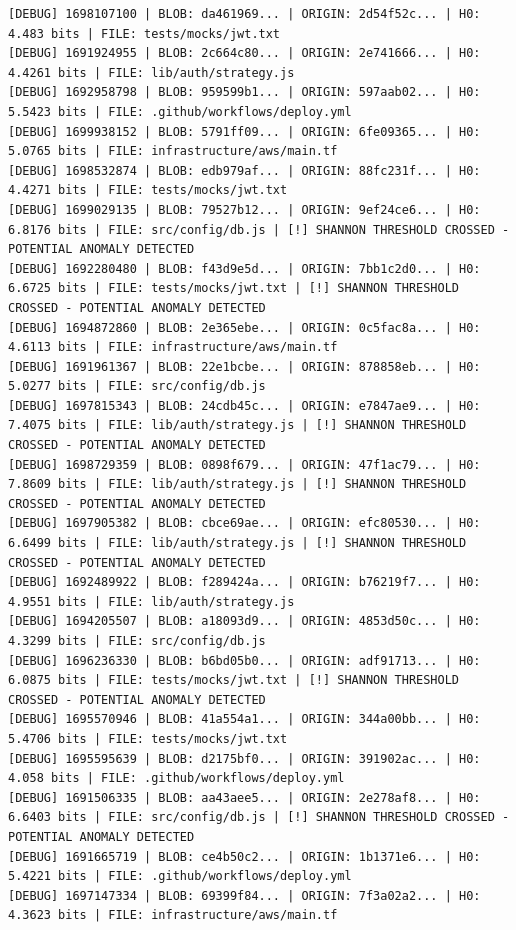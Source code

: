 \documentclass[12pt, a4paper, oneside]{report}
\begin{document}
\begin{lstlisting}[basicstyle=\tiny\ttfamily]
[DEBUG] 1698107100 | BLOB: da461969... | ORIGIN: 2d54f52c... | H0: 4.483 bits | FILE: tests/mocks/jwt.txt
[DEBUG] 1691924955 | BLOB: 2c664c80... | ORIGIN: 2e741666... | H0: 4.4261 bits | FILE: lib/auth/strategy.js
[DEBUG] 1692958798 | BLOB: 959599b1... | ORIGIN: 597aab02... | H0: 5.5423 bits | FILE: .github/workflows/deploy.yml
[DEBUG] 1699938152 | BLOB: 5791ff09... | ORIGIN: 6fe09365... | H0: 5.0765 bits | FILE: infrastructure/aws/main.tf
[DEBUG] 1698532874 | BLOB: edb979af... | ORIGIN: 88fc231f... | H0: 4.4271 bits | FILE: tests/mocks/jwt.txt
[DEBUG] 1699029135 | BLOB: 79527b12... | ORIGIN: 9ef24ce6... | H0: 6.8176 bits | FILE: src/config/db.js | [!] SHANNON THRESHOLD CROSSED - POTENTIAL ANOMALY DETECTED
[DEBUG] 1692280480 | BLOB: f43d9e5d... | ORIGIN: 7bb1c2d0... | H0: 6.6725 bits | FILE: tests/mocks/jwt.txt | [!] SHANNON THRESHOLD CROSSED - POTENTIAL ANOMALY DETECTED
[DEBUG] 1694872860 | BLOB: 2e365ebe... | ORIGIN: 0c5fac8a... | H0: 4.6113 bits | FILE: infrastructure/aws/main.tf
[DEBUG] 1691961367 | BLOB: 22e1bcbe... | ORIGIN: 878858eb... | H0: 5.0277 bits | FILE: src/config/db.js
[DEBUG] 1697815343 | BLOB: 24cdb45c... | ORIGIN: e7847ae9... | H0: 7.4075 bits | FILE: lib/auth/strategy.js | [!] SHANNON THRESHOLD CROSSED - POTENTIAL ANOMALY DETECTED
[DEBUG] 1698729359 | BLOB: 0898f679... | ORIGIN: 47f1ac79... | H0: 7.8609 bits | FILE: lib/auth/strategy.js | [!] SHANNON THRESHOLD CROSSED - POTENTIAL ANOMALY DETECTED
[DEBUG] 1697905382 | BLOB: cbce69ae... | ORIGIN: efc80530... | H0: 6.6499 bits | FILE: lib/auth/strategy.js | [!] SHANNON THRESHOLD CROSSED - POTENTIAL ANOMALY DETECTED
[DEBUG] 1692489922 | BLOB: f289424a... | ORIGIN: b76219f7... | H0: 4.9551 bits | FILE: lib/auth/strategy.js
[DEBUG] 1694205507 | BLOB: a18093d9... | ORIGIN: 4853d50c... | H0: 4.3299 bits | FILE: src/config/db.js
[DEBUG] 1696236330 | BLOB: b6bd05b0... | ORIGIN: adf91713... | H0: 6.0875 bits | FILE: tests/mocks/jwt.txt | [!] SHANNON THRESHOLD CROSSED - POTENTIAL ANOMALY DETECTED
[DEBUG] 1695570946 | BLOB: 41a554a1... | ORIGIN: 344a00bb... | H0: 5.4706 bits | FILE: tests/mocks/jwt.txt
[DEBUG] 1695595639 | BLOB: d2175bf0... | ORIGIN: 391902ac... | H0: 4.058 bits | FILE: .github/workflows/deploy.yml
[DEBUG] 1691506335 | BLOB: aa43aee5... | ORIGIN: 2e278af8... | H0: 6.6403 bits | FILE: src/config/db.js | [!] SHANNON THRESHOLD CROSSED - POTENTIAL ANOMALY DETECTED
[DEBUG] 1691665719 | BLOB: ce4b50c2... | ORIGIN: 1b1371e6... | H0: 5.4221 bits | FILE: .github/workflows/deploy.yml
[DEBUG] 1697147334 | BLOB: 69399f84... | ORIGIN: 7f3a02a2... | H0: 4.3623 bits | FILE: infrastructure/aws/main.tf
\end{lstlisting}
\end{document}
